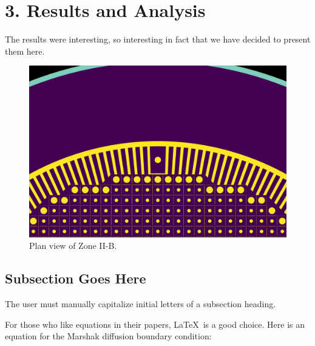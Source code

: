 \documentclass{anstrans}
\begin{document}
\section{3. Results and Analysis}
The results were interesting, so interesting in fact that we have decided to
present them here.

\begin{figure}[ht] %
  \centering
  \includegraphics[width=\linewidth]{figure_2_5.png}
  \caption{Plan view of Zone II-B.}
  \label{fig:zone2B}
\end{figure}

\subsection{Subsection Goes Here}
The user must manually capitalize initial letters of a subsection heading.

For those who like equations in their papers, \LaTeX\ is a good choice. Here is
an equation for the Marshak diffusion boundary condition:
\end{document}
